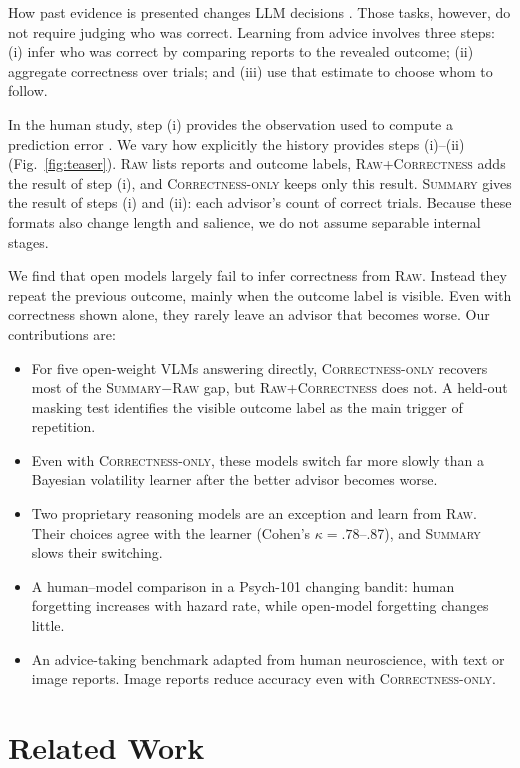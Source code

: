 \documentclass[letterpaper]{article} %
\newcommand{\Raw}{\textsc{Raw}}
\newcommand{\RawCorrectness}{\textsc{Raw+Correctness}}
\newcommand{\CorrectnessOnly}{\textsc{Correctness-only}}
\newcommand{\Summary}{\textsc{Summary}}
\begin{document}
How past evidence is presented changes LLM decisions \citep{ge2026dhgap,krishnamurthy2024explore}. Those tasks, however, do not require judging who was correct. Learning from advice involves three steps: (i) infer who was correct by comparing reports to the revealed outcome; (ii) aggregate correctness over trials; and (iii) use that estimate to choose whom to follow.

In the human study, step (i) provides the observation used to compute a prediction error \citep{behrens2008associative}. We vary how explicitly the history provides steps (i)--(ii) (Fig.~\ref{fig:teaser}). \Raw{} lists reports and outcome labels, \RawCorrectness{} adds the result of step (i), and \CorrectnessOnly{} keeps only this result. \Summary{} gives the result of steps (i) and (ii): each advisor's count of correct trials. Because these formats also change length and salience, we do not assume separable internal stages.

We find that open models largely fail to infer correctness from \Raw{}. Instead they repeat the previous outcome, mainly when the outcome label is visible. Even with correctness shown alone, they rarely leave an advisor that becomes worse. Our contributions are:
\begin{itemize}
  \item[$\bullet$] For five open-weight VLMs answering directly, \CorrectnessOnly{} recovers most of the \Summary{}$-$\Raw{} gap, but \RawCorrectness{} does not. A held-out masking test identifies the visible outcome label as the main trigger of repetition.
  \item[$\bullet$] Even with \CorrectnessOnly{}, these models switch far more slowly than a Bayesian volatility learner after the better advisor becomes worse.
  \item[$\bullet$] Two proprietary reasoning models are an exception and learn from \Raw{}. Their choices agree with the learner (Cohen's $\kappa=.78$--.87), and \Summary{} slows their switching.
  \item[$\bullet$] A human--model comparison in a Psych-101 changing bandit: human forgetting increases with hazard rate, while open-model forgetting changes little.
  \item[$\bullet$] An advice-taking benchmark adapted from human neuroscience, with text or image reports. Image reports reduce accuracy even with \CorrectnessOnly{}.
\end{itemize}

\section{Related Work}
\end{document}
